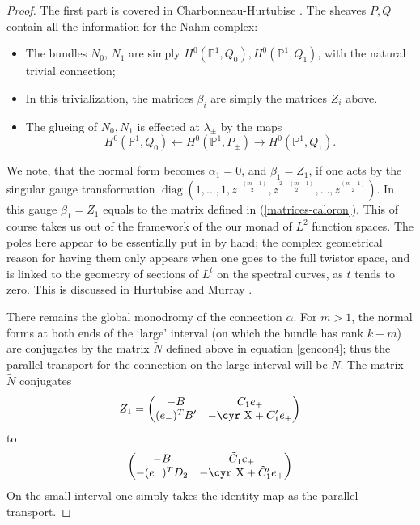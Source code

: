 \documentclass[12pt]{article}
\theoremstyle{definition}
\theoremstyle{remark}
\numberwithin{theorem}{section}
\newcommand{\Sh}{\hbox{\cyr X}}
\def\bP{{\mathbb {P}}}
\DeclareMathOperator{\diag}{diag}
\begin{document}
\begin{proof} The first part is covered in   Charbonneau-Hurtubise \cite[section 5]{Charbonneau:2007zd}. The sheaves $P,Q$ contain all the information for the Nahm complex: 
\begin{itemize}
\item The bundles $N_0$, $N_1$ are simply $H^0(\bP^1, Q_0), H^0(\bP^1, Q_1)$, with the natural trivial connection; 
\item In this trivialization, the matrices $\beta_i$ are simply the matrices $Z_i$ above.
\item The glueing of $N_0, N_1$ is effected at $\lambda_\pm$   by the maps $$H^0(\bP^1, Q_0)\leftarrow H^0(\bP^1, P_\pm)\rightarrow H^0(\bP^1, Q_1).$$
\end{itemize}

We note, that 
the normal form becomes $\alpha_1= 0$, and $\beta_1 = Z_1$, 
if one acts by the singular gauge transformation 
$\diag(1,...,1,   z^{\frac{-(m-1)}{2}}, z^{\frac{2-(m-1)}{2}}, \dots,z^{\frac{(m-1)}{2}})$.  In this gauge $\beta_1 = Z_1$  equals to the matrix defined in (\ref{matrices-caloron}). This of course takes us out of the framework of the our monad of $L^2$ function spaces. 
The poles  here  appear to be  essentially put in by hand; the complex geometrical reason for having them only appears when one goes to the full twistor space, and is linked to the geometry of sections of $L^t$ on the spectral curves, as $t$ tends to zero. This is discussed in Hurtubise and Murray \cite{HurtubiseMurray}.

   There remains the global monodromy of  the connection $\alpha$.  For $m>1$, the normal forms at both ends of the `large' interval (on which the bundle has rank $k+m$) are conjugates by the matrix $\widetilde N$ defined above in equation \eqref{gencon4}; thus the parallel transport for the connection on the large interval will be $\widetilde N$.  The matrix $\widetilde N$ conjugates
 \begin{equation}\label{left-normal} Z_1 = {\begin{pmatrix} -B&C_1e_+\\(e_-)^TB'&-\Sh+C'_1e_+\end{pmatrix}}\end{equation} to
 \begin{equation}\label{right-normal}{\begin{pmatrix} -B&\tilde C_1e_+\\  -(e_-)^TD_2&-\Sh+\tilde C'_1e_+\end{pmatrix}}\end{equation}
 On the small interval one simply takes the identity map as the parallel transport.
 

\end{proof}
\end{document}
